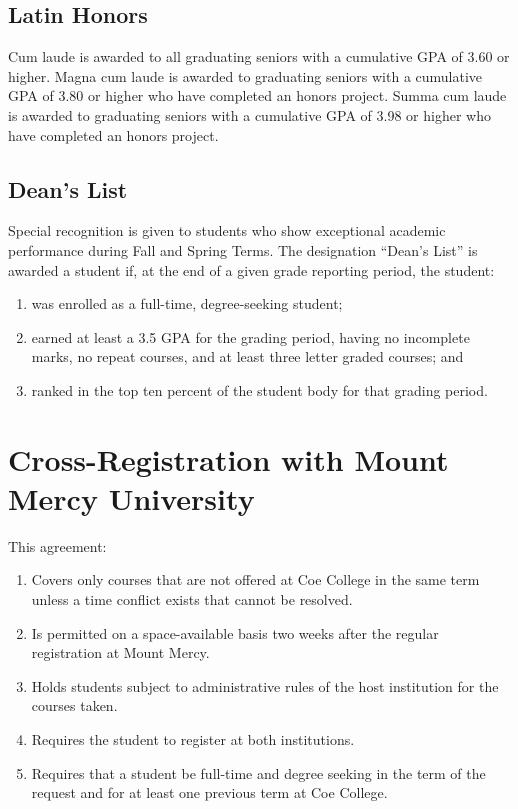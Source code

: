 \documentclass[
  letterpaper,
]{scrbook}
\providecommand{\tightlist}{%
  \setlength{\itemsep}{0pt}\setlength{\parskip}{0pt}}
\begin{document}
\subsection{Latin Honors}\label{latin-honors}

Cum laude is awarded to all graduating seniors with a cumulative GPA of
3.60 or higher. Magna cum laude is awarded to graduating seniors with a
cumulative GPA of 3.80 or higher who have completed an honors project.
Summa cum laude is awarded to graduating seniors with a cumulative GPA
of 3.98 or higher who have completed an honors project.

\subsection{Dean's List}\label{deans-list}

Special recognition is given to students who show exceptional academic
performance during Fall and Spring Terms. The designation ``Dean's
List'' is awarded a student if, at the end of a given grade reporting
period, the student:

\begin{enumerate}
\def\labelenumi{\arabic{enumi}.}
\tightlist
\item
  was enrolled as a full-time, degree-seeking student;
\item
  earned at least a 3.5 GPA for the grading period, having no incomplete
  marks, no repeat courses, and at least three letter graded courses;
  and
\item
  ranked in the top ten percent of the student body for that grading
  period.
\end{enumerate}

\section{Cross-Registration with Mount Mercy
University}\label{cross-registration-with-mount-mercy-university}

This agreement:

\begin{enumerate}
\def\labelenumi{\arabic{enumi}.}
\tightlist
\item
  Covers only courses that are not offered at Coe College in the same
  term unless a time conflict exists that cannot be resolved.
\item
  Is permitted on a space-available basis two weeks after the regular
  registration at Mount Mercy.
\item
  Holds students subject to administrative rules of the host institution
  for the courses taken.
\item
  Requires the student to register at both institutions.
\item
  Requires that a student be full-time and degree seeking in the term of
  the request and for at least one previous term at Coe College.
\end{enumerate}
\end{document}
